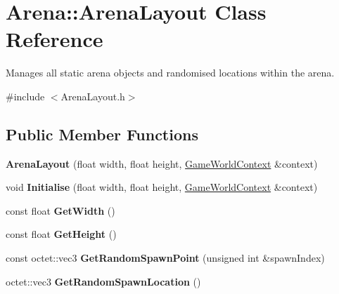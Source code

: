 \hypertarget{class_arena_1_1_arena_layout}{\section{Arena\+:\+:Arena\+Layout Class Reference}
\label{class_arena_1_1_arena_layout}
}


Manages all static arena objects and randomised locations within the arena.  




{\ttfamily \#include $<$Arena\+Layout.\+h$>$}

\subsection*{Public Member Functions}
\begin{DoxyCompactItemize}
\item 
\hypertarget{class_arena_1_1_arena_layout_a0ee525e5d8030b48366e567d509fccf3}{{\bfseries Arena\+Layout} (float width, float height, \hyperlink{struct_arena_1_1_game_world_context}{Game\+World\+Context} \&context)}\label{class_arena_1_1_arena_layout_a0ee525e5d8030b48366e567d509fccf3}

\item 
\hypertarget{class_arena_1_1_arena_layout_ab5853b22eb396c79064de55b57749d3c}{void {\bfseries Initialise} (float width, float height, \hyperlink{struct_arena_1_1_game_world_context}{Game\+World\+Context} \&context)}\label{class_arena_1_1_arena_layout_ab5853b22eb396c79064de55b57749d3c}

\item 
\hypertarget{class_arena_1_1_arena_layout_a99195cea977dee42a76227fc8c0300c2}{const float {\bfseries Get\+Width} ()}\label{class_arena_1_1_arena_layout_a99195cea977dee42a76227fc8c0300c2}

\item 
\hypertarget{class_arena_1_1_arena_layout_a82660c66b1ffa0c680a7ddf151a38e67}{const float {\bfseries Get\+Height} ()}\label{class_arena_1_1_arena_layout_a82660c66b1ffa0c680a7ddf151a38e67}

\item 
\hypertarget{class_arena_1_1_arena_layout_a014787a7f117c1aa043dbadf13f82c64}{const octet\+::vec3 {\bfseries Get\+Random\+Spawn\+Point} (unsigned int \&spawn\+Index)}\label{class_arena_1_1_arena_layout_a014787a7f117c1aa043dbadf13f82c64}

\item 
\hypertarget{class_arena_1_1_arena_layout_a426a1af8d6587ea56d21822ca807df0d}{octet\+::vec3 {\bfseries Get\+Random\+Spawn\+Location} ()}\label{class_arena_1_1_arena_layout_a426a1af8d6587ea56d21822ca807df0d}

\end{DoxyCompactItemize}
